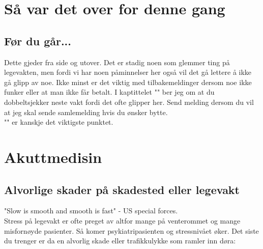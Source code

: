 \documentclass[12pt,a4paper]{memoir}
\begin{document}
\chapter{Så var det over for denne gang}\label{chap:desc_lv_slutt}	 
	\section{Før du går...}
	Dette gjeder fra side \pageref{sec:elv_regns} og utover. Det er stadig noen som glemmer ting på legevakten, men fordi vi har noen påminnelser her også vil det gå lettere å ikke gå glipp av noe. Ikke minst er det viktig med tilbakemeldinger dersom noe ikke funker eller at man ikke får betalt. I kaptittelet "" ber jeg om at du dobbeltsjekker neste vakt fordi det ofte glipper her. Send melding dersom du vil at jeg skal sende samlemelding hvis du ønsker bytte.\\

	"" er kanskje det viktigste punktet. 

\chapter{Akuttmedisin}\label{chap:desc_chk_akuttmed}	
	\section{Alvorlige skader på skadested eller legevakt}\label{sec:desc_chk_traume}
	"Slow is smooth and smooth is fast" - US special forces.\\
	Stress på legevakt er ofte preget av altfor mange på venterommet og mange misfornøyde pasienter. Så komer psykiatripasienten og stressnivået øker. Det siste du trenger er da en alvorlig skade eller trafikkulykke som ramler inn døra:
\end{document}
